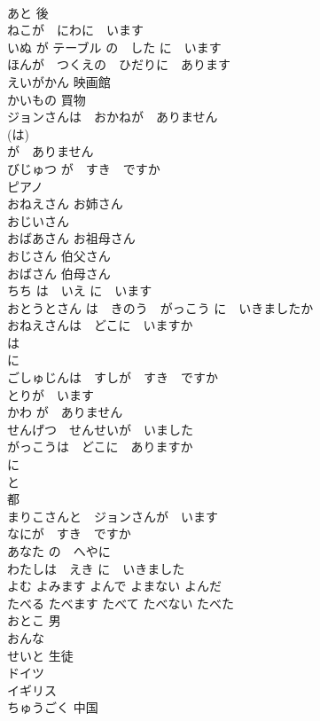 \documentclass[8pt]{extreport}
\begin{document}
\begin{CJK}{UTF8}{min}
\\	あと	後
\\	ねこが　にわに　います	
\\	いぬ が テーブル の　した に　います	
\\	ほんが　つくえの　ひだりに　あります	
\\	えいがかん	映画館
\\	かいもの	買物
\\	ジョンさんは　おかねが　ありません	
\\	(は) 
\\	が　ありません 
\\	びじゅつ が　すき　ですか	
\\	ピアノ	
\\	おねえさん	お姉さん
\\	おじいさん	
\\	おばあさん	お祖母さん
\\	おじさん	伯父さん
\\	おばさん	伯母さん
\\	ちち は　いえ に　います	
\\	おとうとさん は　きのう　がっこう に　いきましたか	
\\	おねえさんは　どこに　いますか	
\\	は 
\\	に 
\\	ごしゅじんは　すしが　すき　ですか	
\\	とりが　います	
\\	かわ が　ありません	
\\	せんげつ　せんせいが　いました	
\\	がっこうは　どこに　ありますか	
\\	に 
\\	と	
\\	都
\\	まりこさんと　ジョンさんが　います	
\\	なにが　すき　ですか	
\\	あなた の　へやに	
\\	わたしは　えき に　いきました	
\\	よむ	よみます	よんで	よまない	よんだ	
\\	たべる	たべます	たべて	たべない	たべた	
\\	おとこ	男
\\	おんな	
\\	せいと	生徒
\\	ドイツ	
\\	イギリス	
\\	ちゅうごく	中国

\end{CJK}
\end{document}
